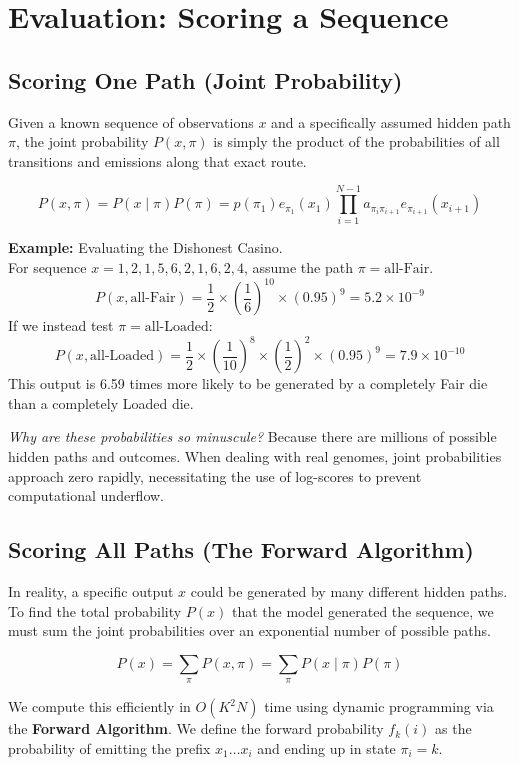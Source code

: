 \section{Evaluation: Scoring a Sequence}

\subsection{Scoring One Path (Joint Probability)}
Given a known sequence of observations $x$ and a specifically assumed hidden path $\pi$, the joint probability $P(x, \pi)$ is simply the product of the probabilities of all transitions and emissions along that exact route.

\[ P(x, \pi) = P(x \mid \pi) P(\pi) = p(\pi_1) e_{\pi_1}(x_1) \prod_{i=1}^{N-1} a_{\pi_i \pi_{i+1}} e_{\pi_{i+1}}(x_{i+1}) \]

\textbf{Example:} Evaluating the Dishonest Casino. \\
For sequence $x = 1, 2, 1, 5, 6, 2, 1, 6, 2, 4$, assume the path $\pi = \text{all-Fair}$.
\[ P(x, \text{all-Fair}) = \frac{1}{2} \times \left(\frac{1}{6}\right)^{10} \times (0.95)^9 = 5.2 \times 10^{-9} \]
If we instead test $\pi = \text{all-Loaded}$:
\[ P(x, \text{all-Loaded}) = \frac{1}{2} \times \left(\frac{1}{10}\right)^8 \times \left(\frac{1}{2}\right)^2 \times (0.95)^9 = 7.9 \times 10^{-10} \]
This output is 6.59 times more likely to be generated by a completely Fair die than a completely Loaded die. 

\sta \textit{Why are these probabilities so minuscule?} Because there are millions of possible hidden paths and outcomes. When dealing with real genomes, joint probabilities approach zero rapidly, necessitating the use of log-scores to prevent computational underflow.

\subsection{Scoring All Paths (The Forward Algorithm)}
In reality, a specific output $x$ could be generated by many different hidden paths. To find the total probability $P(x)$ that the model generated the sequence, we must sum the joint probabilities over an exponential number of possible paths. 

\[ P(x) = \sum_{\pi} P(x, \pi) = \sum_{\pi} P(x \mid \pi) P(\pi) \]

We compute this efficiently in $O(K^2 N)$ time using dynamic programming via the \textbf{Forward Algorithm}. We define the forward probability $f_k(i)$ as the probability of emitting the prefix $x_1 \dots x_i$ and ending up in state $\pi_i = k$.

